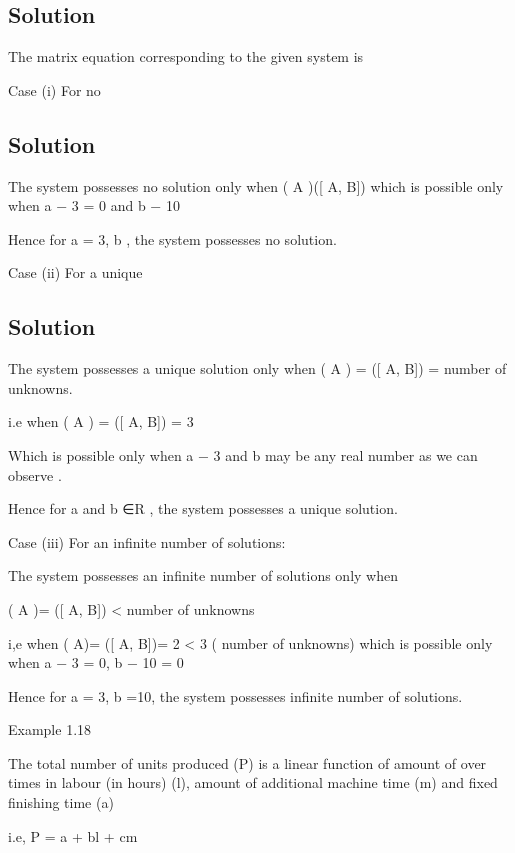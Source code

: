 \documentclass[12pt, a4paper]{article}
\begin{document}
\bigskip \subsection*{Solution}

The matrix equation corresponding to the given system is



Case (i) For no \bigskip \subsection*{Solution}

The system possesses no solution only when \rho ( A )\neq  \rho ([ A, B]) which is possible only when a − 3 = 0 and b − 10 

Hence for a = 3, b  , the system possesses no solution.

Case (ii) For a unique \bigskip \subsection*{Solution}

The system possesses a unique solution only when \rho ( A ) = \rho ([ A, B]) = number of unknowns.

i.e when \rho ( A ) = \rho ([ A, B]) = 3

Which is possible only when a − 3  and b may be any real number as we can observe .

Hence for a  and b ∈R , the system possesses a unique solution.

Case (iii) For an infinite number of solutions:

The system possesses an infinite number of solutions only when

\rho ( A )= \rho ([ A, B]) < number of unknowns

i,e when \rho ( A)= \rho ([ A, B])= 2 < 3 ( number of unknowns) which is possible only when a − 3 = 0, b − 10 = 0

Hence for a = 3, b =10, the system possesses infinite number of solutions.

 
\newpage 

Example 1.18

The total number of units produced (P) is a linear function of amount of over times in labour (in hours) (l), amount of additional machine time (m) and fixed finishing time (a)

i.e, P = a + bl + cm
\end{document}
